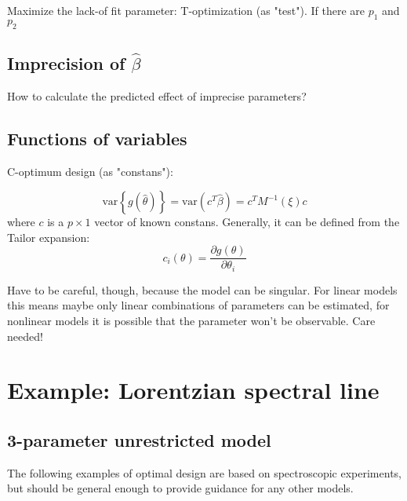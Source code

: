 \documentclass[12pt]{iopart}
\begin{document}
Maximize the lack-of fit parameter: T-optimization (as "test"). If there are $p_1$ and $p_2$

\subsection{Imprecision of $\hat \beta$}

How to calculate the predicted effect of imprecise parameters?

\subsection{Functions of variables}

C-optimum design (as "constans"):

\begin{equation}
\mathrm{var}\left\{g(\hat \theta)\right\} = \mathrm{var}(c^T \hat \beta) = c^T M^{-1}(\xi) c
\end{equation}
where $c$ is a $p \times 1$ vector of known constans. Generally, it can be defined from the Tailor expansion:
\begin{equation}
c_i(\theta) = \frac{\partial g(\theta)}{\partial \theta_i}
\end{equation}

Have to be careful, though, because the model can be singular. For linear models this means maybe only linear combinations of parameters can be estimated, for nonlinear models it is possible that the parameter won't be observable. Care needed!

\section{Example: Lorentzian spectral line}

\subsection{3-parameter unrestricted model}

The following examples of optimal design are based on spectroscopic experiments, but should be general enough to provide guidance for any other models.
\end{document}

